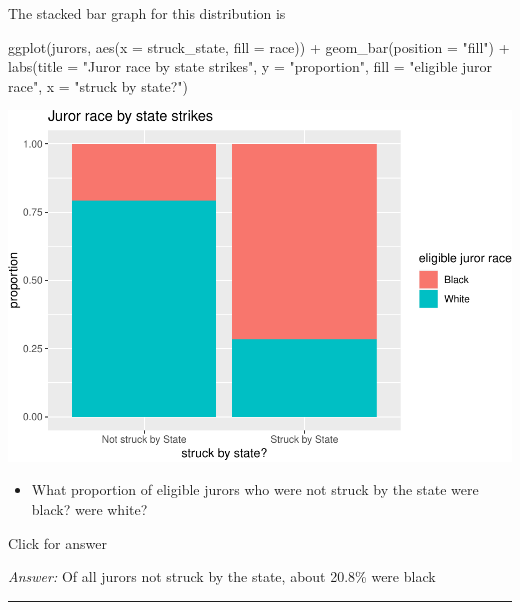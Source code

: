 \documentclass[
]{book}
\newenvironment{Shaded}{\begin{snugshade}}{\end{snugshade}}
\newcommand{\AttributeTok}[1]{\textcolor[rgb]{0.77,0.63,0.00}{#1}}
\newcommand{\FunctionTok}[1]{\textcolor[rgb]{0.00,0.00,0.00}{#1}}
\newcommand{\NormalTok}[1]{#1}
\newcommand{\SpecialCharTok}[1]{\textcolor[rgb]{0.00,0.00,0.00}{#1}}
\newcommand{\StringTok}[1]{\textcolor[rgb]{0.31,0.60,0.02}{#1}}
\providecommand{\tightlist}{%
  \setlength{\itemsep}{0pt}\setlength{\parskip}{0pt}}
\begin{document}
The stacked bar graph for this distribution is

\begin{Shaded}
\begin{Highlighting}[]
\FunctionTok{ggplot}\NormalTok{(jurors, }\FunctionTok{aes}\NormalTok{(}\AttributeTok{x =}\NormalTok{ struck\_state, }\AttributeTok{fill =}\NormalTok{ race)) }\SpecialCharTok{+} 
  \FunctionTok{geom\_bar}\NormalTok{(}\AttributeTok{position =} \StringTok{"fill"}\NormalTok{) }\SpecialCharTok{+} 
  \FunctionTok{labs}\NormalTok{(}\AttributeTok{title =} \StringTok{"Juror race by state strikes"}\NormalTok{, }\AttributeTok{y =} \StringTok{"proportion"}\NormalTok{, }
       \AttributeTok{fill =} \StringTok{"eligible juror race"}\NormalTok{, }\AttributeTok{x =} \StringTok{"struck by state?"}\NormalTok{)}
\end{Highlighting}
\end{Shaded}

\includegraphics[width=1\linewidth]{Class_Activity_4_files/figure-latex/unnamed-chunk-17-1}

\begin{itemize}
\tightlist
\item
  What proportion of eligible jurors who were not struck by the state were black? were white?
\end{itemize}

Click for answer

\emph{Answer:} Of all jurors not struck by the state, about 20.8\% were black

\begin{center}\rule{0.5\linewidth}{0.5pt}\end{center}
\end{document}
